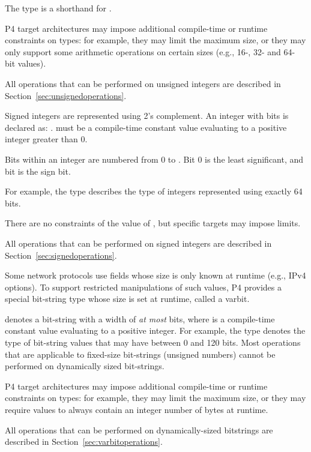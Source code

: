 \documentclass[12pt]{article}
\begin{document}
The type  is a shorthand for .

P4 target architectures may impose additional compile-time or runtime
constraints on  types: for example, they may limit the
maximum size, or they may only support some arithmetic operations on
certain sizes (e.g., 16-, 32- and 64- bit values).

All operations that can be performed on unsigned integers are
described in Section~\ref{sec:unsignedoperations}.


Signed integers are represented using 2's complement.  An integer with
\W{} bits is declared as: \Int{\W}.  \W{} must be a compile-time
constant value evaluating to a positive integer greater than 0.

Bits within an integer are numbered from 0 to . Bit 0 is the least
significant, and bit  is the sign bit.

For example, the type  describes the type of integers
represented using exactly 64 bits.

There are no constraints of the value of \W, but specific targets may
impose limits.

All operations that can be performed on signed integers are
described in Section~\ref{sec:signedoperations}.


Some network protocols use fields whose size is only known at runtime
(e.g., IPv4 options). To support restricted manipulations of such
values, P4 provides a special bit-string type whose size is set at
runtime, called a varbit.

 denotes a bit-string with a width of
\emph{at most} \W{} bits, where \W{} is a compile-time constant value
evaluating to a positive integer.  For example, the type
 denotes the type of bit-string values that
may have between 0 and 120 bits.  Most operations that are applicable
to fixed-size bit-strings (unsigned numbers) cannot be performed on
dynamically sized bit-strings.

P4 target architectures may impose additional compile-time or runtime
constraints on  types: for example, they may limit the
maximum size, or they may require  values to always
contain an integer number of bytes at runtime.

All operations that can be performed on dynamically-sized bitstrings
are described in Section~\ref{sec:varbitoperations}.
\end{document}

